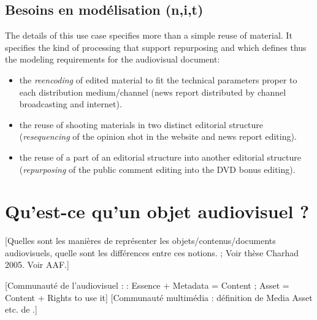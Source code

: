 

\subsection{Besoins en modélisation (n,i,t)}
The details of this use case specifies more than a simple reuse of material. It specifies the kind of processing that support repurposing and which defines thus the modeling requirements for the audiovisual document:
\begin{itemize}
	\item the \textit{reencoding} of edited material to fit the technical parameters proper to each distribution medium/channel (news report distributed by channel broadcasting and internet).
	
	\item the reuse of shooting materials in two distinct editorial structure (\textit{resequencing} of the opinion shot in the website and news report editing).

	\item the reuse of a part of an editorial structure into another editorial structure (\textit{repurposing} of the public comment editing into the DVD bonus editing). 
\end{itemize}








\section{Qu'est-ce qu'un objet audiovisuel ?}\label{sec:dav}
[Quelles sont les manières de représenter les objets/contenus/documents audiovisuels, quelle sont les différences entre ces notions.
\cite{Morizet-mahoudeaux2005a} ;  Voir thèse Charhad 2005. Voir AAF.]

[Communauté de l'audiovisuel : \cite{Cox2006} : Essence + Metadata = Content ; \cite{Austerberry2004} Asset = Content + Rights to use it]
[Communauté multimédia : définition de Media Asset etc. de \cite{Furht2008}.]

